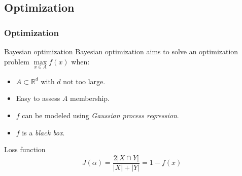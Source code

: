 \subsection{Optimization}
\begin{frame}
    \frametitle{Optimization}
     {
        \begin{block}{Bayesian optimization}
            Bayesian optimization aims to solve an optimization problem $\max\limits_{x\in A}f\left(x\right)$ when:
            \begin{itemize}
                \item $A \subset \mathbb{R}^d$ with $d$ not too large.
                \item Easy to assess $A$ membership.
                \item $f$ can be modeled using \emph{Gaussian process regression}.
                \item $f$ is a \emph{black box}.
            \end{itemize}
        \end{block}
    }
     {
        \begin{exampleblock}{Loss function}
            \begin{equation*}
                J\left(\alpha\right) = \frac{2\lvert X \cap Y \rvert}{\lvert X \rvert + \lvert Y \rvert} = 1-f(x)
            \end{equation*}
        \end{exampleblock}
    }
\end{frame}

